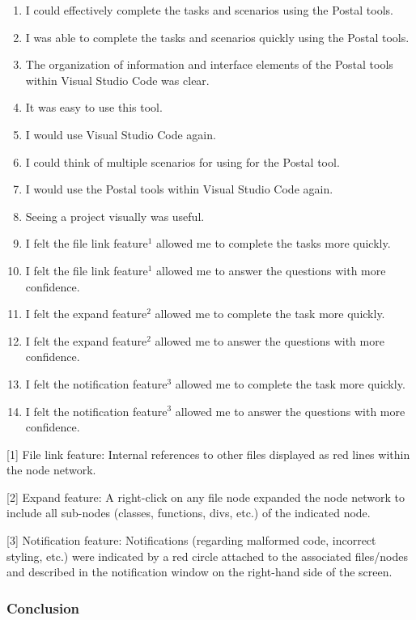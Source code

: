 \documentclass[letterpaper,10pt,titlepage,draftclsnofoot,onecolumn,onesided] {IEEEtran}
\begin{document}
	\begin{enumerate}
		\item I could effectively complete the tasks and scenarios using the Postal tools.
		\item I was able to complete the tasks and scenarios quickly using the Postal tools.
		\item The organization of information and interface elements of the Postal tools within Visual Studio Code was clear.
		\item It was easy to use this tool.
		\item I would use Visual Studio Code again.
		\item I could think of multiple scenarios for using for the Postal tool. 
		\item I would use the Postal tools within Visual Studio Code again.
		\item Seeing a project visually was useful. 
		\item I felt the file link feature$^1$ allowed me to complete the tasks more quickly.
		\item I felt the file link feature$^1$ allowed me to answer the questions with more confidence.
		\item I felt the expand feature$^2$ allowed me to complete the task more quickly.
		\item I felt the expand feature$^2$ allowed me to answer the questions with more confidence.
		\item I felt the notification feature$^3$ allowed me to complete the task more quickly.
		\item I felt the notification feature$^3$ allowed me to answer the questions with more confidence.	
	\end{enumerate}

	[1] File link feature: Internal references to other files displayed as red lines within the node network.

	[2] Expand feature: A right-click on any file node expanded the node network to include all sub-nodes (classes, functions, divs, etc.) of the indicated node.

	[3] Notification feature: Notifications (regarding malformed code, incorrect styling, etc.) were indicated by a red circle attached to the associated files/nodes and described in the notification window on the right-hand side of the screen.
	
	\subsubsection{Conclusion}
	
\end{document}
